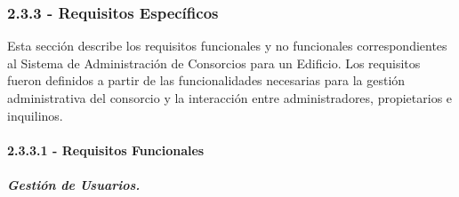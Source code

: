 \subsubsection{2.3.3 - Requisitos Específicos}

Esta sección describe los requisitos funcionales y no funcionales correspondientes al Sistema de Administración de Consorcios para un Edificio.  
Los requisitos fueron definidos a partir de las funcionalidades necesarias para la gestión administrativa del consorcio y la interacción entre administradores, propietarios e inquilinos.

\paragraph{2.3.3.1 - Requisitos Funcionales}

\subparagraph{Gestión de Usuarios.}

